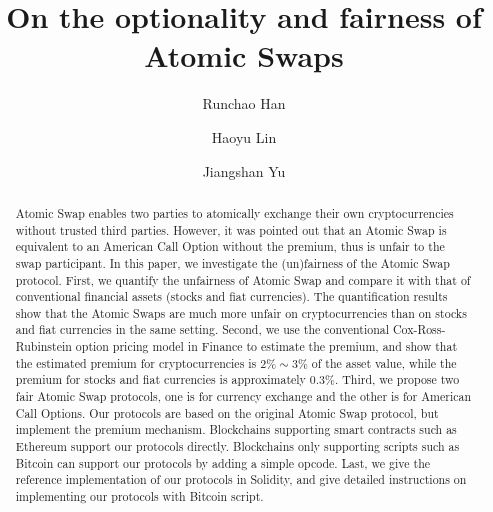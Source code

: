 \documentclass[sigconf, natbib=false]{acmart}
\renewcommand\_{\textunderscore\allowbreak}
\begin{document}
\title{On the optionality and fairness of Atomic Swaps}

\author{Runchao Han}

\author{Haoyu Lin}
\affiliation{%
  \institution{}
}

\author{Jiangshan Yu}

\begin{abstract}
Atomic Swap enables two parties to atomically exchange their own cryptocurrencies without trusted third parties.
However, it was pointed out that an Atomic Swap is equivalent to an American Call Option without the premium, thus is unfair to the swap participant.
In this paper, we investigate the (un)fairness of the Atomic Swap protocol.
First, we quantify the unfairness of Atomic Swap and compare it with that of conventional financial assets (stocks and fiat currencies).
The quantification results show that the Atomic Swaps are much more unfair on cryptocurrencies than on stocks and fiat currencies in the same setting.
Second, we use the conventional Cox-Ross-Rubinstein option pricing model in Finance to estimate the premium, and show that the estimated premium for cryptocurrencies is $2\% \sim 3\%$ of the asset value, while the premium for stocks and fiat currencies is approximately $0.3\%$.
Third, we propose two fair Atomic Swap protocols,
one is for currency exchange and the other is for American Call Options.
Our protocols are based on the original Atomic Swap protocol, but implement the premium mechanism.
Blockchains supporting smart contracts such as Ethereum support our protocols directly.
Blockchains only supporting scripts such as Bitcoin can support our protocols by adding a simple opcode.
Last, we give the reference implementation of our protocols in Solidity, and give detailed instructions on implementing our protocols with Bitcoin script.
\end{abstract}


\maketitle














\printbibliography


\end{document}
